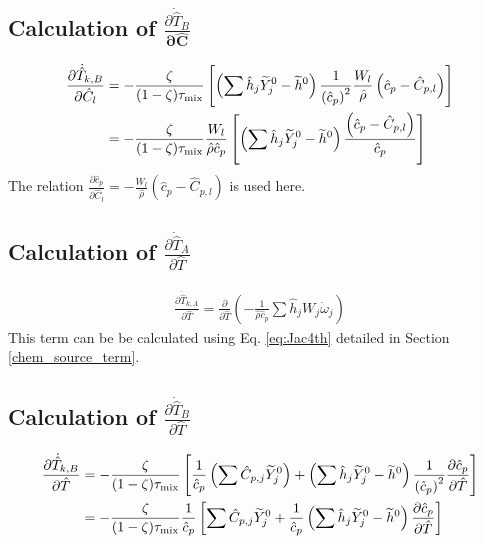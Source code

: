 \subsection*{Calculation of $\frac{\partial \dot{\hat{T}}_B}{\mathbf{\partial \hat{C}}}$}
\begin{align}\label{eq:JacTBC}
\frac{\partial {\dot{\hat{T}}_{k,B}}}{\partial \hat{C}_{l}} &= - \frac{\zeta}{(1-\zeta) \tau_{\rm mix}} \left[\left( \sum{\hat{h}_j \widetilde{Y}_j^0} - \widetilde{h}^0 \right) \frac{1}{\left(\hat{c}_p\right)^2} \frac{W_l}{\hat{\rho}} \left( \hat{c}_p - \hat{C}_{p,l}\right)   \right] \\
&= - \frac{\zeta}{(1-\zeta) \tau_{\rm mix}} \frac{W_l}{\hat{\rho} \hat{c}_p} \left[ \left( \sum{\hat{h}_j \widetilde{Y}_j^0} - \widetilde{h}^0 \right) \frac{\left( \hat{c}_p - \hat{C}_{p,l}\right)}{\hat{c}_p} \right]
\end{align}
The relation $\frac{\partial \hat{c}_p}{\partial \hat{C}_{l}} = - \frac{W_l}{\hat{\rho}}\left( \hat{c}_p -\hat{C}_{p,l} \right)$ is used here.

\subsection*{Calculation of $\frac{\partial \dot{\hat{T}}_A}{\partial \hat{T}}$}
\begin{align}\label{eq:JacTAT}
\frac{\partial {\dot{\hat{T}}_{k,A}}}{\partial \hat{T}} = \frac{\partial}{\partial \hat{T}} \left( -\frac{1}{\hat{\rho} \hat{c}_p} \sum{\hat{h}_j W_j \dot{\omega}_j }\right)
\end{align}
This term can be be calculated using Eq. \ref{eq:Jac4th} detailed in Section \ref{chem_source_term}.

\subsection*{Calculation of $\frac{\partial \dot{\hat{T}}_B}{\partial \hat{T}}$}

\begin{align}\label{eq:JacTBT}
\frac{\partial {\dot{\hat{T}}_{k,B}}}{\partial \hat{T}} &= - \frac{\zeta}{(1-\zeta) \tau_{\rm mix}} \left[\frac{1}{\hat{c}_p}  \left( \sum{\hat{C}_{p,j}\widetilde{Y}_j^0} \right)
+ \left( \sum{\hat{h}_j \widetilde{Y}_j^0} - \widetilde{h}^0 \right) \frac{1}{\left(\hat{c}_p\right)^2} \frac{\partial \hat{c}_p}{\partial \hat{T}}   \right] \\
&= - \frac{\zeta}{(1-\zeta) \tau_{\rm mix}} \frac{1}{\hat{c}_p} \left[ \sum{\hat{C}_{p,j}\widetilde{Y}_j^0} + \frac{1}{\hat{c}_p}\left( \sum{\hat{h}_j \widetilde{Y}_j^0} - \widetilde{h}^0 \right) \frac{\partial \hat{c}_p}{\partial \hat{T}}  \right]
\end{align}

